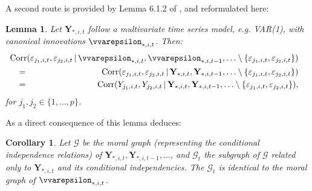 \documentclass[a4paper]{article}
\theoremstyle{myexamplestyle}
\newtheorem{lemma}{Lemma}
\newtheorem{coro}{Corollary}
\begin{document}
A second route is provided by Lemma 6.1.2 of \cite{Real1998}, and reformulated here:
\begin{lemma}
Let $\mathbf{Y}_{\ast, i, t}$ follow a multivariate time series model, e.g. VAR(1), with canonical innovations $\vvarepsilon_{\ast, i, t}$. Then:
\begin{eqnarray*}
& & \hspace{-1.0cm}
\mbox{Corr}(\varepsilon_{j_1, i, t}, \varepsilon_{j_2, i, t} \, | \,
\vvarepsilon_{\ast, i, t}, \vvarepsilon_{\ast, i, t-1}, \ldots \setminus
\{ \varepsilon_{j_1, i, t}, \varepsilon_{j_2, i, t} \} )
\\
& = &
\mbox{Corr}(\varepsilon_{j_1, i, t}, \varepsilon_{j_2, i, t} \, | \,
\mathbf{Y}_{\ast, i, t}, \mathbf{Y}_{\ast, i, t-1}, \ldots \setminus
\{ \varepsilon_{j_1, i, t}, \varepsilon_{j_2, i, t} \} )
\\
& = &
\mbox{Corr}(Y_{j_1, i, t}, Y_{j_2, i, t} \, | \,
\mathbf{Y}_{\ast, i, t}, \mathbf{Y}_{\ast, i, t-1}, \ldots \setminus
\{ \varepsilon_{j_1, i, t}, \varepsilon_{j_2, i, t} \} ),
\end{eqnarray*}
for $j_1, j_2 \in \{1, \ldots, p \}$.
\end{lemma}
\noindent
As a direct consequence of this lemma \cite{Real1998} deduces:
\begin{coro}
Let $\mathcal{G}$ be the moral graph (representing the conditional independence relations) of $\mathbf{Y}_{\ast, i, t}, \mathbf{Y}_{\ast, i, t-1}, \ldots$, and $\mathcal{G}_t$ the subgraph of $\mathcal{G}$ related only to $\mathbf{Y}_{\ast, i, t}$ and its conditional independencies. The $\mathcal{G}_t$ is identical to the moral graph of $\vvarepsilon_{\ast, i, t}$.
\end{coro}
\end{document}
